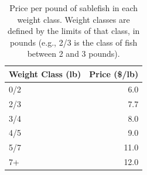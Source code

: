 \documentclass[11pt]{book}
\begin{document}
\begingroup\fontsize{12}{14}\selectfont
\begin{longtable}[t]{lr}
\caption{\label{tab:unnamed-chunk-9}Price per pound of sablefish in each weight class. Weight classes are defined by the limits of that class, in pounds (e.g., 2/3 is the class of fish between 2 and 3 pounds).}\\
\toprule
\textbf{Weight Class (lb)} & \textbf{Price (\$/lb)}\\
\midrule
0/2 & 6.0\\
2/3 & 7.7\\
3/4 & 8.0\\
4/5 & 9.0\\
5/7 & 11.0\\
7+ & 12.0\\
\bottomrule
\end{longtable}
\endgroup{}

\newpage
\end{document}
